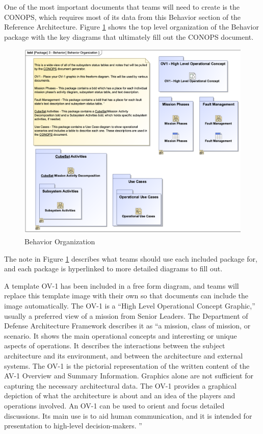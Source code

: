 One of the most important documents that teams will need to create is the CONOPS, which requires most of its data from this Behavior section of the Reference Architecture. Figure \ref{fig:Behavior Organization} shows the top level organization of the Behavior package with the key diagrams that ultimately fill out the CONOPS document. 

\begin{figure}[H]
    \centering
    \includegraphics[width=\textwidth]{Thesis/Analysis_and_Results/Analysis and Results Figures/Behavior Organization.png}
    \caption{Behavior Organization}
    \label{fig:Behavior Organization}
\end{figure}

The note in Figure \ref{fig:Behavior Organization} describes what teams should use each included package for, and each package is hyperlinked to more detailed diagrams to fill out.  

A template OV-1 has been included in a free form diagram, and teams will replace this template image with their own so that documents can include the image automatically. The OV-1 is a “High Level Operational Concept Graphic,” usually a preferred view of a mission from Senior Leaders.  The Department of Defense Architecture Framework describes it as “a mission, class of mission, or scenario. It shows the main operational concepts and interesting or unique aspects of operations. It describes the interactions between the subject architecture and its environment, and between the architecture and external systems. The OV-1 is the pictorial representation of the written content of the AV-1 Overview and Summary Information. Graphics alone are not sufficient for capturing the necessary architectural data. The OV-1 provides a graphical depiction of what the architecture is about and an idea of the players and operations involved. An OV-1 can be used to orient and focus detailed discussions. Its main use is to aid human communication, and it is intended for presentation to high-level decision-makers. \citep{DoDAF}” 

